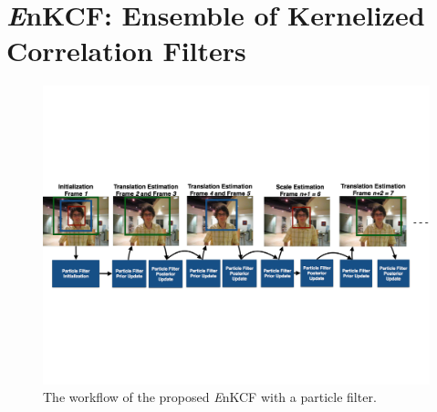 \documentclass{bmvc2k}
\begin{document}
\begin{itemize}

\end{itemize}

\section{{\it E}nKCF: Ensemble of Kernelized Correlation Filters}

\begin{figure}[!t]
\includegraphics[width=\textwidth]{figures/Workflow_MKCF+PF.pdf}
\caption{The workflow of the proposed {\it E}nKCF with a particle filter.}
\label{Workflow_figure_EnKCF}
\end{figure}
\end{document}
